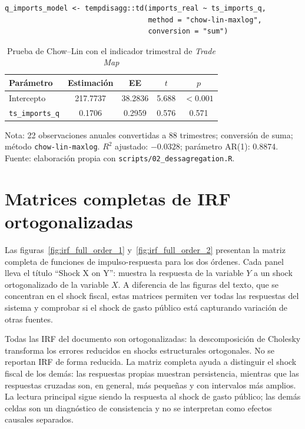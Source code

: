 \documentclass[11pt,a4paper]{article}
\begin{document}
\begin{verbatim}
q_imports_model <- tempdisagg::td(imports_real ~ ts_imports_q,
                                  method = "chow-lin-maxlog",
                                  conversion = "sum")
\end{verbatim}

\begin{table}[htbp]
\centering
\small
\begin{threeparttable}
\caption{Prueba de Chow--Lin con el indicador trimestral de \emph{Trade Map}}
\label{tab:anexo_trademap}
\begin{tabular}{@{}lcccc@{}}
\toprule
Parámetro & Estimación & EE & $t$ & $p$ \\
\midrule
Intercepto & 217.7737 & 38.2836 & 5.688 & $<0.001$ \\
\texttt{ts\_imports\_q} & 0.1706 & 0.2959 & 0.576 & 0.571 \\
\bottomrule
\end{tabular}
\begin{tablenotes}\footnotesize
\item Nota: 22 observaciones anuales convertidas a 88 trimestres; conversión
de suma; método \texttt{chow-lin-maxlog}. $R^2$ ajustado: $-0.0328$;
parámetro AR(1): 0.8874. Fuente: elaboración propia con
\texttt{scripts/02\_dessagregation.R}.
\end{tablenotes}
\end{threeparttable}
\end{table}

\clearpage
\section{Matrices completas de IRF ortogonalizadas}
\label{sec:anexo_irf}

Las figuras~\ref{fig:irf_full_order_1} y~\ref{fig:irf_full_order_2} presentan
la matriz completa de funciones de impulso-respuesta para los dos órdenes.
Cada panel lleva el título ``Shock X on Y'': muestra la respuesta de la variable
$Y$ a un shock ortogonalizado de la variable $X$. A diferencia de las figuras
del texto, que se concentran en el shock fiscal, estas matrices permiten ver
todas las respuestas del sistema y comprobar si el shock de gasto público está
capturando variación de otras fuentes.

Todas las IRF del documento son ortogonalizadas: la descomposición de Cholesky
transforma los errores reducidos en shocks estructurales ortogonales. No se
reportan IRF de forma reducida. La matriz completa ayuda a distinguir el shock
fiscal de los demás: las respuestas propias muestran persistencia, mientras que
las respuestas cruzadas son, en general, más pequeñas y con intervalos más
amplios. La lectura principal sigue siendo la respuesta al shock de gasto
público; las demás celdas son un diagnóstico de consistencia y no se interpretan
como efectos causales separados.
\end{document}
